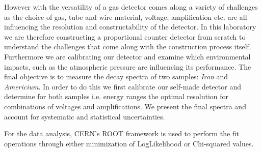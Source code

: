 However with the versatility of a gas detector comes along a variety of challenges
as the choice of gas, tube and wire material, voltage, amplification etc. are
all influencing the resolution and constructability of the detector. In this
laboratory we are therefore constructing a proportional counter detector from
scratch to understand the challenges that come along with the construction
process itself. Furthermore we are calibrating our detector and examine which
environmental impacts, such as the atmospheric pressure are influencing its
performance. The final objective is to measure the decay spectra of two samples:
\emph{Iron} and \emph{Americium}. In order to do this we first calibrate our self-made
detector and determine for both samples i.e. energy ranges the optimal
resolution for combinations of voltages and amplifications. We present the final
spectra and account for systematic and statistical uncertainties.

For the data analysis, CERN's ROOT framework\cite{Brun:1997pa} is used to perform the fit operations through either minimization of LogLikelihood or Chi-squared values.